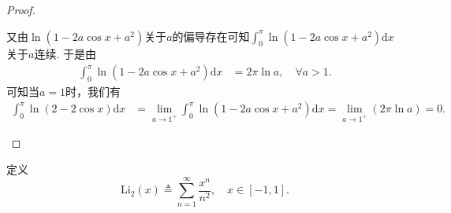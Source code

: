 \documentclass[../../main.tex]{subfiles}%
\begin{document}
\begin{proof}
\begin{enumerate}
又由\(\ln(1 - 2a\cos x + a^2)\)关于\(a\)的偏导存在可知\(\int_0^{\pi} \ln(1 - 2a\cos x + a^2) \mathrm{d}x\)关于\(a\)连续. 于是由
\\
\begin{align*}
\int_0^{\pi} \ln(1 - 2a\cos x + a^2) \mathrm{d}x &= 2\pi \ln a, \quad \forall a > 1.
\end{align*}
可知当\(a = 1\)时，我们有
\\
\begin{align*}
\int_0^{\pi} \ln(2 - 2\cos x) \mathrm{d}x &= \lim_{a \to 1^+} \int_0^{\pi} \ln(1 - 2a\cos x + a^2) \mathrm{d}x = \lim_{a \to 1^+} (2\pi \ln a) = 0.
\end{align*} 
\end{enumerate}
\end{proof}

\begin{definition}
定义  
\[
\mathrm{Li}_2(x) \triangleq \sum_{n=1}^{\infty} \frac{x^n}{n^2}, \quad x \in [-1,1].
\] 
\end{definition}
\end{document}
